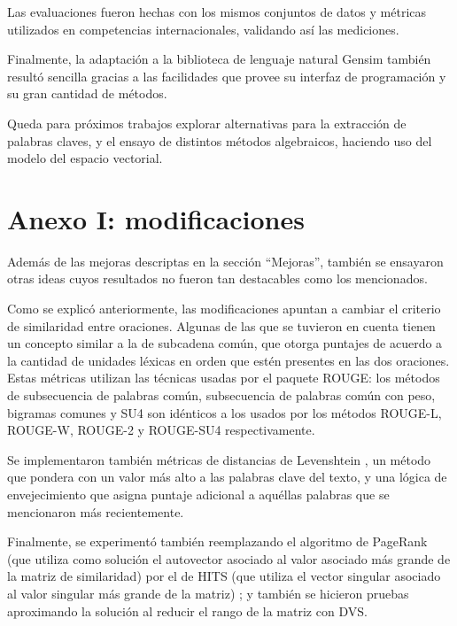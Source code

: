 \documentclass[a4paper]{article}
\begin{document}
Las evaluaciones fueron hechas con los mismos conjuntos de datos y métricas utilizados en competencias internacionales, validando así las mediciones.

Finalmente, la adaptación a la biblioteca de lenguaje natural Gensim también resultó sencilla gracias a las facilidades que provee su interfaz de programación y su gran cantidad de métodos.

Queda para próximos trabajos explorar alternativas para la extracción de palabras claves, y el ensayo de distintos métodos algebraicos, haciendo uso del modelo del espacio vectorial.


\newpage
\section{Anexo I: modificaciones}
Además de las mejoras descriptas en la sección “Mejoras”, también se ensayaron otras ideas cuyos resultados no fueron tan destacables como los mencionados.

Como se explicó anteriormente, las modificaciones apuntan a cambiar el criterio de similaridad entre oraciones. Algunas de las que se tuvieron en cuenta tienen un concepto similar a la de subcadena común, que otorga puntajes de acuerdo a la cantidad de unidades léxicas en orden que estén presentes en las dos oraciones. Estas métricas utilizan las técnicas usadas por el paquete ROUGE: los métodos de subsecuencia de palabras común, subsecuencia de palabras común con peso, bigramas comunes y SU4 son idénticos a los usados por los métodos ROUGE-L, ROUGE-W, ROUGE-2 y ROUGE-SU4 respectivamente.

Se implementaron también métricas de distancias de Levenshtein \cite{levenshtein}, un método que pondera con un valor más alto a las palabras clave del texto, y una lógica de envejecimiento que asigna puntaje adicional a aquéllas palabras que se mencionaron más recientemente.

Finalmente, se experimentó también reemplazando el algoritmo de PageRank (que utiliza como solución el autovector asociado al valor asociado más grande de la matriz de similaridad) por el de HITS (que utiliza el vector singular asociado al valor singular más grande de la matriz) \cite{kleinberg}; y también se hicieron pruebas aproximando la solución al reducir el rango de la matriz con DVS. 
\end{document}
